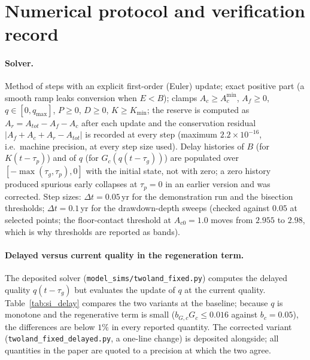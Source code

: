 \documentclass[11pt,a4paper]{article}
\newcommand{\Acmin}{A_c^{\min}}
\begin{document}
\section{Numerical protocol and verification record}\label{si:numerics}

\paragraph{Solver.} Method of steps with an explicit first-order (Euler) update; exact positive part (a smooth ramp leaks conversion when $E<B$); clamps $A_c\ge\Acmin$, $A_f\ge0$, $q\in[0,q_{\max}]$, $P\ge0$, $D\ge0$, $K\ge K_{\min}$; the reserve is computed as $A_r=A_{tot}-A_f-A_c$ after each update and the conservation residual $|A_f+A_c+A_r-A_{tot}|$ is recorded at every step (maximum $2.2\times10^{-16}$, i.e.\ machine precision, at every step size used). Delay histories of $B$ (for $K(t-\tau_p)$) and of $q$ (for $G_c(q(t-\tau_g))$) are populated over $[-\max(\tau_g,\tau_p),0]$ with the initial state, not with zero; a zero history produced spurious early collapses at $\tau_p=0$ in an earlier version and was corrected. Step sizes: $\Delta t=0.05$\,yr for the demonstration run and the bisection thresholds; $\Delta t=0.1$\,yr for the drawdown-depth sweeps (checked against $0.05$ at selected points; the floor-contact threshold at $A_{c0}=1.0$ moves from $2.955$ to $2.98$, which is why thresholds are reported as bands).

\paragraph{Delayed versus current quality in the regeneration term.} The deposited solver (\texttt{model\_sims/twoland\_fixed.py}) computes the delayed quality $q(t-\tau_g)$ but evaluates the update of $q$ at the current quality. Table~\ref{tab:si_delay} compares the two variants at the baseline; because $q$ is monotone and the regenerative term is small ($b_{G,c}G_c\le0.016$ against $b_c=0.05$), the differences are below $1\%$ in every reported quantity. The corrected variant (\texttt{twoland\_fixed\_delayed.py}, a one-line change) is deposited alongside; all quantities in the paper are quoted to a precision at which the two agree.
\end{document}
